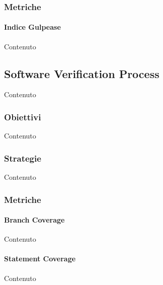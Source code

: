     \subsubsection{Metriche}

    \paragraph{Indice Gulpease}
    Contenuto


    \subsection{Software Verification Process}
    Contenuto

    \subsubsection{Obiettivi}
    Contenuto

    \subsubsection{Strategie}
    Contenuto


    \subsubsection{Metriche}

    \paragraph{Branch Coverage}
    Contenuto

    \paragraph{Statement Coverage}
    Contenuto